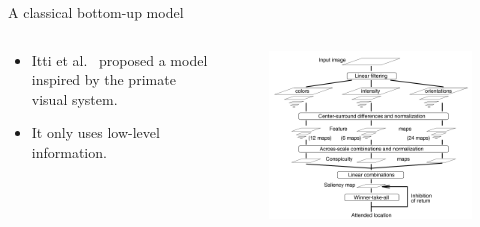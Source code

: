 \documentclass[xcolor=pdftex,dvipsnames,table,mathserif]{beamer}
\begin{document}
\begin{frame}{A classical bottom-up model}

\begin{columns}
  \begin{column}{.4\textwidth}
\begin{itemize}
\item Itti et al.~\cite{itti_model_1998} proposed a model inspired by the primate visual system.
\item It only uses low-level information.
\end{itemize}


  \end{column}

  \begin{column}{.6\textwidth}
\begin{figure}[ht]
  \centering
  \includegraphics[width=\textwidth]{visual_attention_model_itti}
\end{figure}

  \end{column}
\end{columns}



\end{frame}
\end{document}
